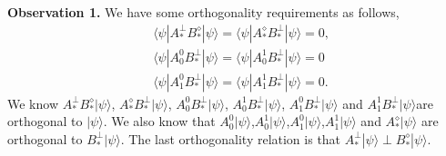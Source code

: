 \documentclass[11pt,letterpaper]{article}
\newcommand{\ket}[1]{|#1\rangle}
\newcommand{\bra}[1]{\langle#1|}
\newcommand{\1}{\mathbb{1}}
\theoremstyle{definition}
\begin{document}
\textbf{Observation 1.} We have some orthogonality requirements as follows,
\begin{align}
	&\bra{\psi}A_\ast^\perp B_\ast^\diamond \ket{\psi}= \bra{\psi}A_\ast^\diamond B_\ast^\perp \ket{\psi} = 0,\\
	&\bra{\psi}A_0^0 B_\ast^\perp \ket{\psi} = \bra{\psi}A_0^1 B_\ast^\perp \ket{\psi} = 0\\
	&\bra{\psi}A_1^0 B_\ast^\perp \ket{\psi} = \bra{\psi}A_1^1 B_\ast^\perp \ket{\psi} = 0.
\end{align}
We know $A_\ast^\perp B_\ast^\diamond \ket{\psi}$, $A_\ast^\diamond B_\ast^\perp \ket{\psi}$,  $A_0^0 B_\ast^\perp \ket{\psi}$,
$A_0^1 B_\ast^\perp \ket{\psi}$, $A_1^0 B_\ast^\perp \ket{\psi}$ and $A_1^1 B_\ast^\perp \ket{\psi}$are orthogonal to $\ket{\psi}$.
We also know that $A_0^0\ket{\psi}$,$A_0^1\ket{\psi}$,$A_1^0\ket{\psi}$,$A_1^1\ket{\psi}$ and $A_\ast^\diamond\ket{\psi}$ are
orthogonal to $B_\ast^\perp \ket{\psi}$. The last orthogonality relation is that $A_\ast^\perp\ket{\psi} \perp B_\ast^\diamond \ket{\psi}.$
\end{document}
